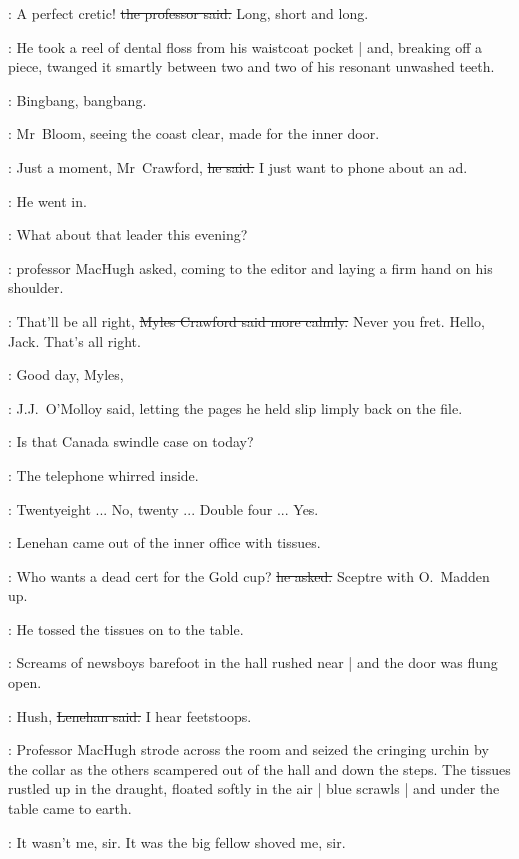 \machugh:
A perfect cretic!
\sout{the professor said.}
Long, short and long.




:
He took a reel of dental floss from his waistcoat pocket |
and, breaking off a piece,
twanged it smartly between two and two of his resonant unwashed teeth.

\BloomInt:
Bingbang, bangbang.

:
Mr~Bloom, seeing the coast clear,
made for the inner door.

\Bloom:
Just a moment, Mr~Crawford,
\sout{he said.}
I just want to phone about an ad.

:
He went in.

\machugh:
What about that leader this evening?

:
professor MacHugh asked,
coming to the editor and laying a firm hand on his shoulder.

\crawford:
That'll be all right,
\sout{Myles Crawford said more calmly.}
Never you fret.
Hello, Jack.
That's all right.

\jjom:
Good day, Myles,

:
J.J.~O'Molloy said,
letting the pages he held slip limply back on the file.

\jjom:
Is that Canada swindle case on today?

:
The telephone whirred inside.

\Bloom:
Twentyeight ...
No, twenty ...
Double four ...
Yes.



:
Lenehan came out of the inner office with  tissues.

\lenehan:
Who wants a dead cert for the Gold cup?
\sout{he asked.}
Sceptre with O.~Madden up.

:
He tossed the tissues on to the table.

:
Screams of newsboys barefoot in the hall rushed near |
and the door was flung open.

\lenehan:
Hush,
\sout{Lenehan said.}
I hear feetstoops.

:
Professor MacHugh strode across the room
and seized the cringing urchin by the collar
as the others scampered out of the hall and down the steps.
The tissues rustled up in the draught,
floated softly in the air |
blue scrawls |
and under the table came to earth.

\boy:
It wasn't me, sir.
It was the big fellow shoved me, sir.

